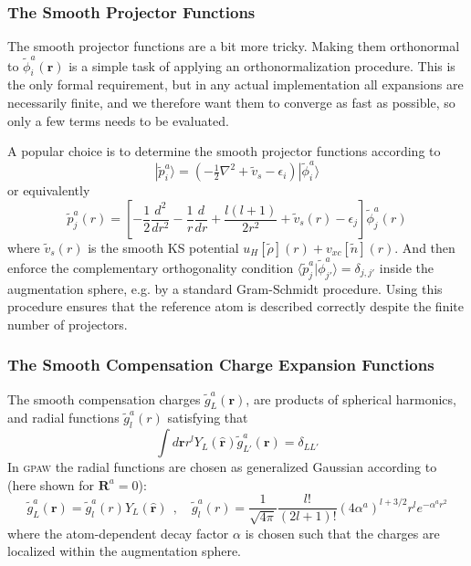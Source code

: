 \documentclass[a4paper]{article}
\newcommand{\gpaw}{\textsc{gpaw}}
\newcommand{\f}[1]{\mathbf{#1}}
\newcommand{\s}[1]{\tilde{#1}}
\newcommand{\br}{\mathbf{r}}
\newcommand{\bR}{\mathbf{R}}
\newcommand{\ket}[1]{| #1 \rangle}
\newcommand{\braket}[2]{\langle #1 | #2 \rangle}
\begin{document}
\subsubsection*{The Smooth Projector Functions}
\par The smooth projector functions are a bit more tricky.  Making
them orthonormal to $\s{\phi}_i^a(\f{r})$ is a simple task of applying
an orthonormalization procedure. This is the only formal requirement,
but in any actual implementation all expansions are necessarily
finite, and we therefore want them to converge as fast as possible, so
only a few terms needs to be evaluated.
\par A popular choice is to determine the smooth projector functions
according to
%
\begin{equation}\label{eq: construct projector}
  \ket{\s{p}_i^a} = \left( -\tfrac{1}{2} \nabla^2 + \s{v}_s - \epsilon_i\right) \ket{\s{\phi}^a_i}
\end{equation}
%
or equivalently
%
\begin{equation}
  \s{p}_{j}^a(r) = \left[-\frac{1}{2}\frac{d^2}{dr^2} - \frac{1}{r}\frac{d}{dr} + \frac{l(l+1)}{2r^2} + \s{v}_s(r) - \epsilon_j \right] \s{\phi}^a_j(r)
\end{equation}
%
where $\s{v}_s(r)$ is the smooth KS potential $u_H[\s{\rho}](r) +
v_{xc}[\s{n}](r)$. And then enforce the complementary orthogonality
condition $\braket{\s{p}_{j}^a}{\s{\phi}^a_{j'}} = \delta_{j,j'}$
inside the augmentation sphere, e.g. by a standard Gram-Schmidt
procedure. Using this procedure ensures that the reference atom is
described correctly despite the finite number of projectors.

\subsubsection*{The Smooth Compensation Charge Expansion Functions}\label{sec: choosing comp charge}
The smooth compensation charges $\s{g}_L^a(\br)$, are products of
spherical harmonics, and radial functions $\s{g}_l^a(r)$ satisfying
that
%
\begin{equation}
\int d\f{r} r^l Y_L(\hat{\f{r}})\s{g}_{L'}^a(\f{r}) = \delta_{LL'}
\end{equation}
% 
In \gpaw{} the radial functions are chosen as generalized Gaussian
according to (here shown for $\bR^a=0$):
%
\begin{equation}\label{eq: generalized gaussians}
\s{g}_L^a(\f{r}) = \s{g}_l^a(r) Y_L(\hat{\f{r}})~~,\quad
\s{g}_l^a(r) = \frac{1}{\sqrt{4\pi}}\frac{l!}{(2l+1)!}(4\alpha^a)^{l+3/2}r^le^{-\alpha^ar^2}
\end{equation}
%
where the atom-dependent decay factor $\alpha$ is chosen such that
the charges are localized within the augmentation sphere.
\end{document}
